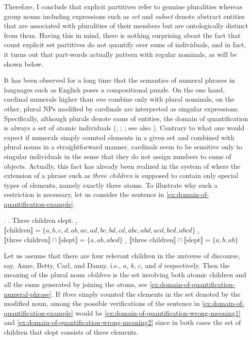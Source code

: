 Therefore, I conclude that explicit partitives refer to genuine pluralities where\-as group nouns including expressions such as \textit{set} and \textit{subset} denote abstract entities that are associated with pluralities of their members but are ontologically distinct from them. Having this in mind, there is nothing surprising about the fact that count explicit set partitives do not quantify over sums of individuals, and in fact, it turns out that part-words actually pattern with regular nominals, as will be shown below. 

It has been observed for a long time that the semantics of numeral phrases in languages such as English poses a compositional puzzle. On the one hand, cardinal numerals higher than \textit{one} combine only with plural nominals, on the other, plural NPs modified by cardinals are interpreted as singular expressions. Specifically, although plurals denote sums of entities, the domain of quantification is always a set of atomic individuals (\citealt{kratzer1989investigation}; \citealt{chierchia1998reference}; \citealt{landman2000events}; see also \citealt{kobuchi-philip2006identity}). Contrary to what one would expect if numerals simply counted elements in a given set \citep[e.g.,][]{barwise_cooper1981generalized} and combined with plural nouns in a straightforward manner, cardinals seem to be sensitive only to singular individuals in the sense that they do not assign numbers to sums of objects. Actually, this fact has already been realized in the system of \citet{link1983logical} where the extension of a phrase such as \textit{three children} is supposed to contain only special types of elements, namely exactly three atoms. To illustrate why such a restriction is necessary, let us consider the sentence in \ref{ex:domain-of-quantification-example}.   

\ex.\label{ex:domain-of-quantification} \a. Three children slept.\label{ex:domain-of-quantification-example}		
	 \b. $\llbracket \text{children} \rrbracket = \{a, b, c, d, ab, ac, ad, bc, bd, cd, abc, abd, acd, bcd, abcd\}$\label{ex:domain-of-quantification-numeral-phrase}
     \b. $\llbracket \text{three children} \rrbracket \cap \llbracket \text{slept} \rrbracket = \{a, ab, abcd\}$\label{ex:domain-of-quantification-wrong-meaning1}
     \b. $\llbracket \text{three children} \rrbracket \cap \llbracket \text{slept} \rrbracket = \{a, b, ab\}$\label{ex:domain-of-quantification-wrong-meaning2}

Let us assume that there are four relevant children in the universe of discourse, say, Anne, Betty, Carl, and Danny, i.e., $a$, $b$, $c$, and $d$ respectively. Then the meaning of the plural noun \textit{children} is the set involving both atomic children and all the sums generated by joining the atoms, see \ref{ex:domain-of-quantification-numeral-phrase}. If \textit{three} simply counted the elements in the set denoted by the modified noun, among the possible verifications of the sentence in \ref{ex:domain-of-quantification-example} would be \ref{ex:domain-of-quantification-wrong-meaning1} and \ref{ex:domain-of-quantification-wrong-meaning2} since in both cases the set of children that slept consists of three elements.

